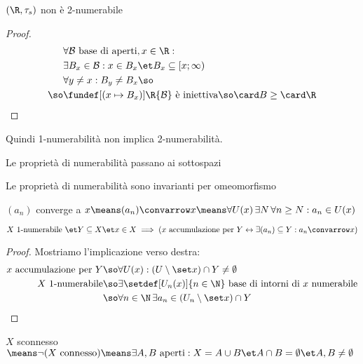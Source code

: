 \begin{prop}
$(\R,\tau_s)$ non è 2-numerabile
\end{prop}
\begin{proof}
\begin{align*}
&\forall\mathcal B\text{ base di aperti},x\in\R:\\
&\exists B_x\in\mathcal B:x\in B_x\et B_x\subseteq [x;\infty)\\
&\forall y\neq x:B_y\neq B_x\so\\
\so&\fundef[(x\mapsto B_x)]\R{\mathcal B}\text{ è iniettiva}\so\card B\geq\card\R \qedhere
\end{align*}
\end{proof}

\begin{oss}
Quindi 1-numerabilità non implica 2-numerabilità.
\end{oss}

\begin{prop}
Le proprietà di numerabilità passano ai sottospazi
\end{prop}

\begin{prop}
Le proprietà di numerabilità sono invarianti per omeomorfismo
\end{prop}

\begin{defn}[Convergenza]
$(a_n)$ converge a $x\means(a_n)\convarrow x\means\forall U(x)\,\exists N\,\forall n\geq N:a_n\in U(x)$
\end{defn}

\begin{prop}
$X\text{ 1-numerabile }\et Y\subseteq X\et x\in X\implies(x\text{ accumulazione per }Y\leftrightarrow\exists(a_n)\subseteq Y:a_n\convarrow x)$
\end{prop}
\begin{proof}
Mostriamo l'implicazione verso destra:
\begin{align*}
x\text{ accumulazione per }Y\so&\forall U(x):(U\setminus\set x)\cap Y\neq\emptyset\\
X\text{ 1-numerabile}\so&\exists\setdef[U_n(x)]{n\in\N}\text{ base di intorni di }x\text{ numerabile}\\
\so&\forall n\in\N\,\exists a_n\in(U_n\setminus\set x)\cap Y \qedhere
\end{align*}
\end{proof}


\begin{defn}[Connessione]
$X$ sconnesso $\means\neg(X\text{ connesso})\means\exists A,B\text{ aperti}:X=A\cup B\et A\cap B=\emptyset\et A,B\neq\emptyset$
\end{defn}

